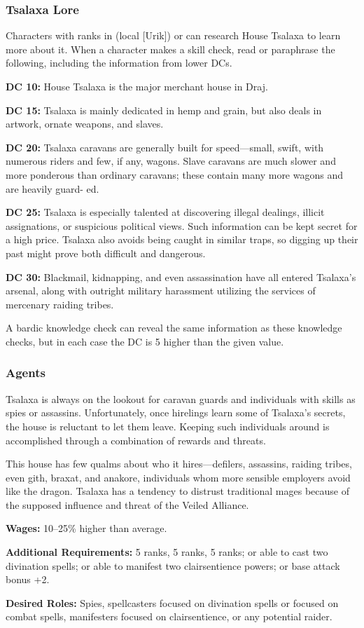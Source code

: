 \subsubsection{Tsalaxa Lore}
Characters with ranks in  (local [Urik]) or  can research House Tsalaxa to learn more about it. When a character makes a skill check, read or paraphrase the following, including the information from lower DCs.

\textbf{DC 10:} House Tsalaxa is the major merchant house in Draj.

\textbf{DC 15:} Tsalaxa is mainly dedicated in hemp and grain, but also deals in artwork, ornate weapons, and slaves.

\textbf{DC 20:} Tsalaxa caravans are generally built
for speed---small, swift, with numerous riders and
few, if any, wagons. Slave caravans are much slower
and more ponderous than ordinary caravans; these
contain many more wagons and are heavily guard-
ed.

\textbf{DC 25:} Tsalaxa is especially talented at discovering illegal dealings, illicit assignations, or suspicious political views. Such information can be kept secret for a high price. Tsalaxa also avoids being caught in similar traps, so digging up their past might prove both difficult and dangerous.

\textbf{DC 30:} Blackmail, kidnapping, and even assassination have all entered Tsalaxa's arsenal, along with outright military harassment utilizing the services of mercenary raiding tribes.

A bardic knowledge check can reveal the same information as these knowledge checks, but in each case the DC is 5 higher than the given value.

\subsubsection{Agents}
Tsalaxa is always on the lookout for caravan guards and individuals with skills as spies or assassins. Unfortunately, once hirelings learn some of Tsalaxa's secrets, the house is reluctant to let them leave. Keeping such individuals around is accomplished through a combination of rewards and threats.

This house has few qualms about who it hires---defilers, assassins, raiding tribes, even gith, braxat, and anakore, individuals whom more sensible employers avoid like the dragon. Tsalaxa has a tendency to distrust traditional mages because of the supposed influence and threat of the Veiled Alliance.

\textbf{Wages:} 10--25\% higher than average.

\textbf{Additional Requirements:}  5 ranks,  5 ranks,  5 ranks; or able to cast two divination spells; or able to manifest two clairsentience powers; or base attack bonus +2.

\textbf{Desired Roles:} Spies, spellcasters focused on divination spells or focused on combat spells, manifesters focused on clairsentience, or any potential raider.
